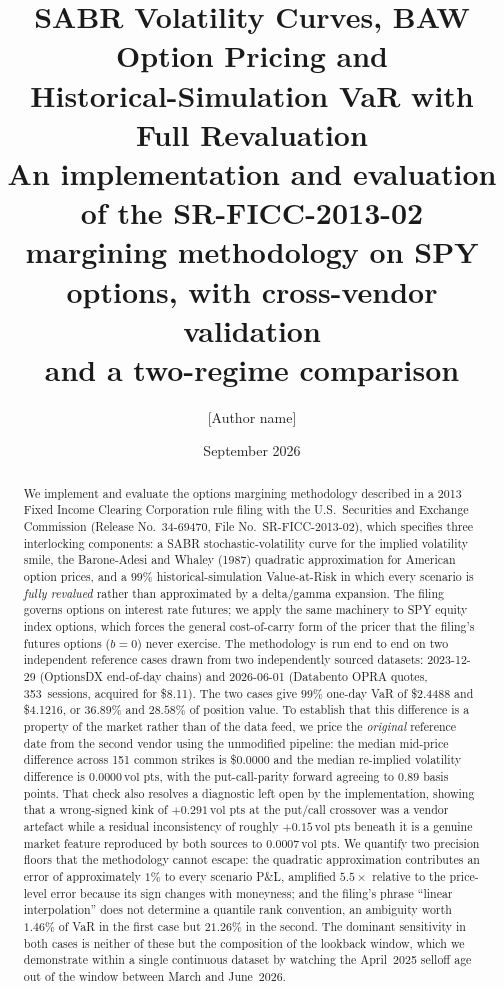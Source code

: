 \documentclass[11pt]{article}
\title{\bfseries SABR Volatility Curves, BAW Option Pricing and\\
       Historical-Simulation VaR with Full Revaluation\\[4pt]
       \large An implementation and evaluation of the SR-FICC-2013-02\\
       margining methodology on SPY options, with cross-vendor validation\\
       and a two-regime comparison}
\author{[Author name]}
\date{September 2026}
\newcommand{\vp}{\,\text{vol pts}}
\begin{document}
\maketitle

\begin{abstract}
\noindent
We implement and evaluate the options margining methodology described in a 2013 Fixed
Income
Clearing Corporation rule filing with the U.S.\ Securities and Exchange Commission
(Release No.~34-69470, File No.~SR-FICC-2013-02), which specifies three interlocking
components: a SABR stochastic-volatility curve for the implied volatility smile, the
Barone-Adesi and Whaley (1987) quadratic approximation for American option prices, and
a $99\%$ historical-simulation Value-at-Risk in which every scenario is
\emph{fully revalued} rather than approximated by a delta/gamma expansion. The filing
governs options on interest rate futures; we apply the same machinery to SPY equity
index options, which forces the general cost-of-carry form of the pricer that the
filing's futures options ($b=0$) never exercise. The methodology is run end to end on
two independent reference cases drawn from two independently sourced datasets:
2023-12-29 (OptionsDX end-of-day chains) and 2026-06-01 (Databento OPRA quotes,
353~sessions, acquired for \$8.11). The two cases give $99\%$ one-day VaR of
\$2.4488 and \$4.1216, or $36.89\%$ and $28.58\%$ of position value.
To establish that this difference is a property of the market rather than of the data
feed, we price the \emph{original} reference date from the second vendor using the
unmodified pipeline: the median mid-price difference across 151 common strikes is
\$0.0000 and the median re-implied volatility difference is $0.0000\vp$, with the
put-call-parity forward agreeing to $0.89$ basis points. That check also resolves a
diagnostic left open by the implementation, showing that a wrong-signed kink of
$+0.291\vp$ at the put/call crossover was a vendor artefact while a residual
inconsistency of roughly $+0.15\vp$ beneath it is a genuine market feature reproduced
by both sources to $0.0007\vp$. We quantify two precision floors that the
methodology cannot escape: the quadratic approximation contributes an error of
approximately $1\%$ to every scenario P\&L, amplified $5.5\times$ relative to the
price-level error because its sign changes with moneyness; and the filing's phrase
``linear interpolation'' does not determine a quantile rank convention, an ambiguity
worth $1.46\%$ of VaR in the first case but $21.26\%$ in the second. The dominant
sensitivity in both cases is neither of these but the composition of the lookback
window, which we demonstrate within a single continuous dataset by watching the
April~2025 selloff age out of the window between March and June~2026.
\end{abstract}
\end{document}
